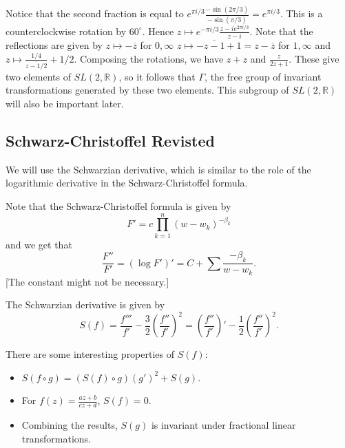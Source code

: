 \documentclass[12pt]{scrartcl}
\newcommand{\R}{\mathbb{R}}
\let \ol \overline
\begin{document}
Notice that the second fraction is equal to $e^{\pi i/3} \frac{- \sin(2\pi/3)}{- \sin(\pi/3)} = e^{\pi i /3}$.  This is a counterclockwise rotation by $60^\circ$.  Hence $z \mapsto e^{-\pi i/3} \frac{z - ie^{2\pi i /3}}{z - i}$.  Note that the reflections are given by $z \mapsto - \ol{z}$ for $0, \infty$ $z \mapsto - \ol{z - 1} + 1 = z - \ol{z}$ for $1, \infty$ and $z \mapsto \frac{1/4}{\ol{z - 1/2}}+1/2$.  Composing the rotations, we have $z + z$ and $\frac{z}{2z+1}$.  These give two elements of $SL(2, \R)$, so it follows that $\Gamma$, the free group of invariant transformations generated by these two elements.   This subgroup of $SL(2, \R)$ will also be important later.  

\subsection{Schwarz-Christoffel Revisted}

We will use the Schwarzian derivative, which is similar to the role of the logarithmic derivative in the Schwarz-Christoffel formula. 

Note that the Schwarz-Christoffel formula is given by 
$$F' = c\prod_{k=1}^n (w - w_k)^{-\beta_k}$$
and we get that $$\frac{F''}{F'} = (\log F')' = C + \sum\frac{-\beta_k}{w - w_k}.$$
[The constant might not be necessary.]

The Schwarzian derivative is given by
$$S(f) = \frac{f'''}{f'} - \frac{3}{2}\left (\frac{f''}{f'}\right )^2 = \left (\frac{f''}{f'}\right )' - \frac{1}{2} \left (\frac{f''}{f'}\right )^2.$$

There are some interesting properties of $S(f)$: 
\begin{itemize}
\item $S(f \circ g) = (S(f) \circ g)(g')^2 + S(g)$.
\item For $f(z) = \frac{az+ b}{cz + d}$, $S(f) = 0$.
\item Combining the results, $S(g)$ is invariant under fractional linear transformations.  
\end{itemize}
\end{document}
